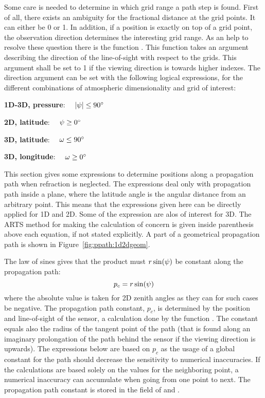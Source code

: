 Some care is needed to determine in which grid range a path step is
found. First of all, there exists an ambiguity for the fractional
distance at the grid points. It can either be 0 or 1. In addition, if
a position is exactly on top of a grid point, the observation
direction determines the interesting grid range. As an help to resolve
these question there is the function .
This function takes an argument describing the direction of the
line-of-sight with respect to the grids. This argument shall be set to
1 if the viewing direction is towards higher indexes. The direction
argument can be set with the following logical expressions, for the
different combinations of atmospheric dimensionality and grid of
interest:

 {\bf 1D-3D, pressure}: $\quad |\psi| \leq 90^\circ$

 {\bf 2D, latitude}: $\quad \psi \geq 0^\circ$

 {\bf 3D, latitude}: $\quad \omega \leq 90^\circ$

 {\bf 3D, longitude}: $\quad \omega \geq 0^\circ$





\label{sec:ppath:basicgeom}

This section gives some expressions to determine positions along a
propagation path when refraction is neglected. The expressions deal
only with propagation path inside a plane, where the latitude angle is
the angular distance from an arbitrary point. This means that the
expressions given here can be directly applied for 1D and 2D. Some of
the expression are alos of interest for 3D. The ARTS method for making
the calculation of concern is given inside parenthesis above each
equation, if not stated explicitly. A part of a geometrical
propagation path is shown in Figure~\ref{fig:ppath:1d2dgeom}.

The law of sines gives that the product must $r\sin(\psi)$ be
constant along the propagation path:
\begin{equation}
  p_c = r\sin(\psi)
  \label{eq:ppath:geomconst}
\end{equation}
where the absolute value is taken for 2D zenith angles as they can for
such cases be negative. The propagation path constant, $p_c$, is
determined by the position and line-of-sight of the sensor, a
calculation done by the function . The
constant equals also the radius of the tangent point of the path (that
is found along an imaginary prolongation of the path behind the sensor
if the viewing direction is upwards). The expressions below are based
on $p_c$ as the usage of a global constant for the path should
decrease the sensitivity to numerical inaccuracies. If the
calculations are based solely on the values for the neighboring
point, a numerical inaccuracy can accumulate when going from one point
to next. The propagation path constant is stored in the field
 of  and .

